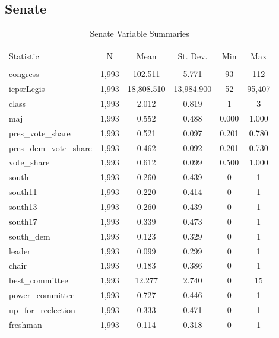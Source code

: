 \documentclass[12pt]{article}
\begin{document}
\subsection{Senate}

\begin{table}[H] \centering 
	\caption{Senate Variable Summaries} 
	\label{} 
	\begin{tabular}{@{\extracolsep{5pt}}lccccc} 
		\\[-1.8ex]\hline 
		\hline \\[-1.8ex] 
		Statistic & \multicolumn{1}{c}{N} & \multicolumn{1}{c}{Mean} & \multicolumn{1}{c}{St. Dev.} & \multicolumn{1}{c}{Min} & \multicolumn{1}{c}{Max} \\ 
		\hline \\[-1.8ex] 
		congress & 1,993 & 102.511 & 5.771 & 93 & 112 \\ 
		icpsrLegis & 1,993 & 18,808.510 & 13,984.900 & 52 & 95,407 \\ 
		class & 1,993 & 2.012 & 0.819 & 1 & 3 \\ 
		maj & 1,993 & 0.552 & 0.488 & 0.000 & 1.000 \\ 
		pres\_vote\_share & 1,993 & 0.521 & 0.097 & 0.201 & 0.780 \\ 
		pres\_dem\_vote\_share & 1,993 & 0.462 & 0.092 & 0.201 & 0.730 \\ 
		vote\_share & 1,993 & 0.612 & 0.099 & 0.500 & 1.000 \\ 
		south & 1,993 & 0.260 & 0.439 & 0 & 1 \\ 
		south11 & 1,993 & 0.220 & 0.414 & 0 & 1 \\ 
		south13 & 1,993 & 0.260 & 0.439 & 0 & 1 \\ 
		south17 & 1,993 & 0.339 & 0.473 & 0 & 1 \\ 
		south\_dem & 1,993 & 0.123 & 0.329 & 0 & 1 \\ 
		leader & 1,993 & 0.099 & 0.299 & 0 & 1 \\ 
		chair & 1,993 & 0.183 & 0.386 & 0 & 1 \\ 
		best\_committee & 1,993 & 12.277 & 2.740 & 0 & 15 \\ 
		power\_committee & 1,993 & 0.727 & 0.446 & 0 & 1 \\ 
		up\_for\_reelection & 1,993 & 0.333 & 0.471 & 0 & 1 \\ 
		freshman & 1,993 & 0.114 & 0.318 & 0 & 1 \\ 

\end{tabular}
\end{table}
\end{document}
